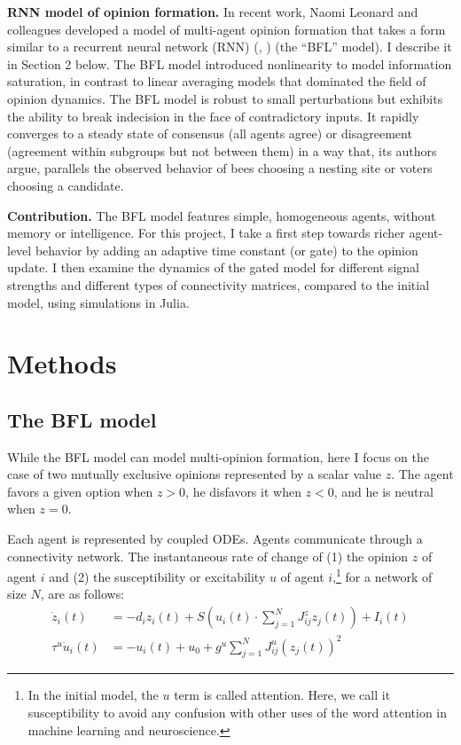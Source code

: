 \documentclass[]{article}
\begin{document}
\textbf{RNN model of opinion formation.} In recent work, Naomi Leonard and colleagues developed a model of multi-agent opinion formation that takes a form similar to a recurrent neural network (RNN) (\cite{bizyaevaNonlinearOpinionDynamics2022}, \cite{leonardFastFlexibleMultiAgent2024}) (the “BFL” model). I describe it in Section 2 below. The BFL model introduced nonlinearity to model information saturation, in contrast to linear averaging models that dominated the field of opinion dynamics. The BFL model is robust to small perturbations but exhibits the ability to break indecision in the face of contradictory inputs. It rapidly converges to a steady state of consensus (all agents agree) or disagreement (agreement within subgroups but not between them) in a way that, its authors argue, parallels the observed behavior of bees choosing a nesting site or voters choosing a candidate.

\textbf{Contribution.} The BFL model features simple, homogeneous agents, without memory or intelligence.  For this project, I take a first step towards richer agent-level behavior by adding an adaptive time constant (or gate) to the opinion update. I then examine the dynamics of the gated model for different signal strengths and different types of connectivity matrices, compared to the initial model, using simulations in Julia.

\section{Methods}
\subsection{The BFL model}

While the BFL model can model multi-opinion formation, here I focus on the case of two mutually exclusive opinions represented by a scalar value $z$. The agent favors a given option when $z>0$, he disfavors it when $z<0$, and he is neutral when $z = 0$.

Each agent is represented by coupled ODEs. Agents communicate through a connectivity network. The instantaneous rate of change of (1) the opinion $z$ of agent $i$ and (2) the susceptibility or excitability $u$ of agent $i$,\footnote{In the initial model, the $u$ term is called attention. Here, we call it susceptibility to avoid any confusion with other uses of the word attention in machine learning and neuroscience.} for a network of size $N$, are as follows:
\begin{align}
	\dot{z}_{i}(t) &= -d_{i}z_{i}(t) + S \left( u_i(t) \cdot  \sum^{N}_{j=1} J^z_{ij}z_{j}(t)  \right) + I_{i}(t) \\
	\tau^u \dot{u}_i(t) &= -u_i(t)+u_0+g^u \sum ^{N}_{j=1} J^u_{ij}(z_{j}(t))^2
\end{align}
\end{document}
